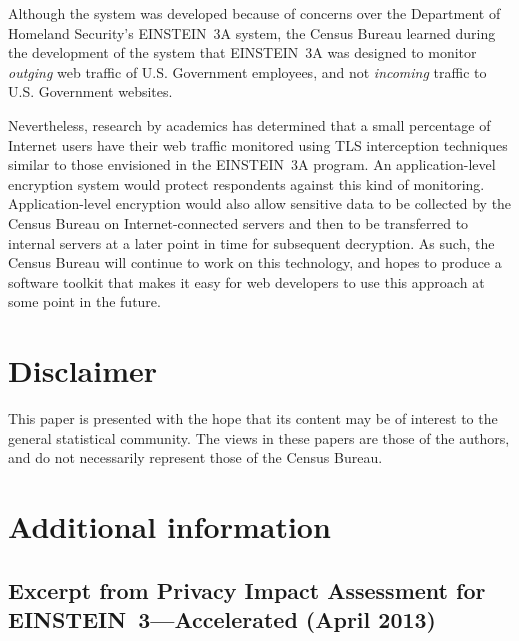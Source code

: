 \documentclass[fleqn,10pt]{wlscirep}
\begin{document}
Although the system was
developed because of concerns over the Department of Homeland
Security's EINSTEIN~3A system, the Census Bureau learned during the
development of the system that EINSTEIN~3A was designed to monitor
\emph{outging} web traffic of U.S. Government employees, and not
\emph{incoming} traffic to U.S. Government websites.

Nevertheless, research by academics has determined that a small
percentage of Internet users have their web traffic monitored using
TLS interception techniques similar to those envisioned in the
EINSTEIN~3A program. An application-level encryption system would
protect respondents against this kind of monitoring. Application-level
encryption would also allow sensitive data to be collected by the
Census Bureau on Internet-connected servers and then to be transferred 
to internal servers at a later point in time for subsequent
decryption. As such, the Census Bureau will continue to work on this
technology, and hopes to produce a software toolkit that makes it easy
for web developers to use this approach at some point in the future.


\section{Disclaimer}
This paper is presented with the hope that its content may be of interest to the general statistical community. The views in these papers are those of the authors, and do not necessarily represent those of the Census Bureau.

%


\section{Additional information}

\subsection{Excerpt from Privacy Impact Assessment for EINSTEIN~3---Accelerated (April 2013)}
\end{document}
